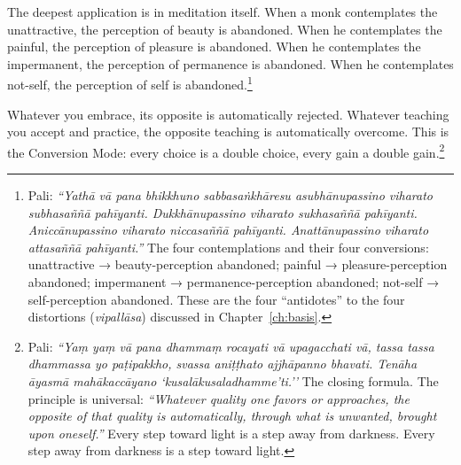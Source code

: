 The deepest application is in meditation itself. When a monk contemplates the unattractive, the perception of beauty is abandoned. When he contemplates the painful, the perception of pleasure is abandoned. When he contemplates the impermanent, the perception of permanence is abandoned. When he contemplates not-self, the perception of self is abandoned.\footnote{Pali: \textit{``Yathā vā pana bhikkhuno sabbasaṅkhāresu asubhānupassino viharato subhasaññā pahīyanti. Dukkhānupassino viharato sukhasaññā pahīyanti. Aniccānupassino viharato niccasaññā pahīyanti. Anattānupassino viharato attasaññā pahīyanti.''} The four contemplations and their four conversions: unattractive → beauty-perception abandoned; painful → pleasure-perception abandoned; impermanent → permanence-perception abandoned; not-self → self-perception abandoned. These are the four ``antidotes'' to the four distortions (\textit{vipallāsa}) discussed in Chapter~\ref{ch:basis}.}

Whatever you embrace, its opposite is automatically rejected. Whatever teaching you accept and practice, the opposite teaching is automatically overcome. This is the Conversion Mode: every choice is a double choice, every gain a double gain.\footnote{Pali: \textit{``Yaṃ yaṃ vā pana dhammaṃ rocayati vā upagacchati vā, tassa tassa dhammassa yo paṭipakkho, svassa aniṭṭhato ajjhāpanno bhavati. Tenāha āyasmā mahākaccāyano `kusalākusaladhamme'ti.''} The closing formula. The principle is universal: \textit{``Whatever quality one favors or approaches, the opposite of that quality is automatically, through what is unwanted, brought upon oneself.''} Every step toward light is a step away from darkness. Every step away from darkness is a step toward light.}
